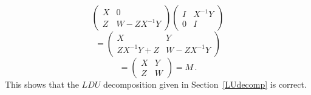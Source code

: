{\[\left(\begin{array}{c|c}X&0\\\hline Z&W-ZX^{-1}Y\end{array}\right)
\left(\begin{array}{c|c}I&X^{-1}Y\\\hline 0&I\end{array}\right)
\] \[=
\left(\begin{array}{c|c}X&Y\\\hline ZX^{-1}Y+Z&W-ZX^{-1}Y\end{array}\right)
\]
\[
=\left(\begin{array}{c|c}X&Y\\\hline Z&W\end{array}\right)=M\, .
\]
This shows that the $LDU$ decomposition given in Section~\ref{LUdecomp} is correct.
} %


